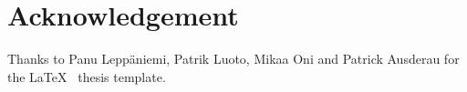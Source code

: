 
\pagestyle{empty}
\chapter*{Acknowledgement}

Thanks to Panu Leppäniemi, Patrik Luoto, Mikaa Oni and Patrick Ausderau for the \LaTeX{} ~thesis template.

\clearpage

